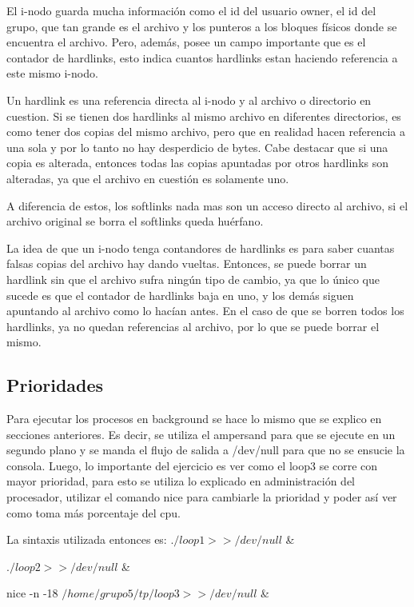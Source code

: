 \documentclass[a4paper, 12pt]{article}
\begin{document}
El i-nodo guarda mucha informaci\'on como el id del usuario owner, el id del grupo, que tan grande es el archivo y los punteros a los bloques f\'isicos donde se encuentra el archivo. Pero, adem\'as, posee un campo importante que es el contador de hardlinks, esto indica cuantos hardlinks estan haciendo referencia a este mismo i-nodo. 


Un hardlink es una referencia directa al i-nodo y al archivo o directorio en cuestion. Si se tienen dos hardlinks al mismo archivo en diferentes directorios, es como tener dos copias del mismo archivo, pero que en realidad hacen referencia a una sola y por lo tanto no hay desperdicio de bytes. Cabe destacar que si una copia es alterada, entonces todas las copias apuntadas por otros hardlinks son alteradas, ya que el archivo en cuesti\'on es solamente uno. 

A diferencia de estos, los softlinks nada mas son un acceso directo al archivo, si el archivo original se borra el softlinks queda hu\'erfano.

La idea de que un i-nodo tenga contandores de hardlinks es para saber cuantas falsas copias del archivo hay dando vueltas. Entonces, se puede borrar un hardlink sin que el archivo sufra ning\'un tipo de cambio, ya que lo \'unico que sucede es que el contador de hardlinks baja en uno, y los dem\'as siguen apuntando al archivo como lo hac\'ian antes. En el caso de que se borren todos los hardlinks, ya no quedan referencias al archivo, por lo que se puede borrar el mismo. 


\subsection*{Prioridades}

Para ejecutar los procesos en background se hace lo mismo que se explico en secciones anteriores. Es decir, se utiliza el ampersand para que se ejecute en un segundo plano y se manda el flujo de salida a /dev/null para que no se ensucie la consola. Luego, lo importante del ejercicio es ver como el loop3 se corre con mayor prioridad, para esto se utiliza lo explicado en administraci\'on del procesador, utilizar el comando nice para cambiarle la prioridad y poder as\'i ver como toma m\'as porcentaje del cpu.

La sintaxis utilizada entonces es:
$./loop1 >> /dev/null$ \&

$./loop2 >> /dev/null$ \&

nice -n -18 $/home/grupo5/tp/loop3 >> /dev/null$ \&
\end{document}
